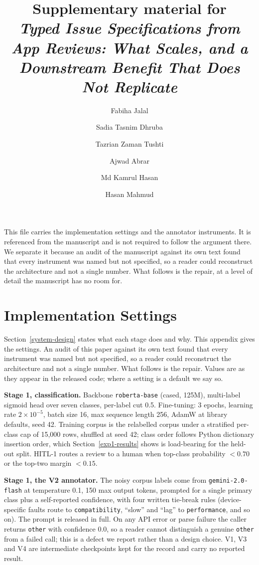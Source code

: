 \documentclass[11pt]{article}
\title{Supplementary material for\\
\emph{Typed Issue Specifications from App Reviews: What Scales, and a Downstream Benefit That
Does Not Replicate}}
\author{Fabiha Jalal \and Sadia Tasnim Dhruba \and Tazrian Zaman Tushti \and Ajwad Abrar \and
Md Kamrul Hasan \and Hasan Mahmud}
\date{}
\begin{document}
\maketitle

This file carries the implementation settings and the annotator instruments. It is referenced
from the manuscript and is not required to follow the argument there. We separate it because an
audit of the manuscript against its own text found that every instrument was named but not
specified, so a reader could reconstruct the architecture and not a single number. What follows
is the repair, at a level of detail the manuscript has no room for.

\section{Implementation Settings}\label{appendix:settings}

  Section~\ref{system-design} states what each stage does and why. This appendix gives the
  settings. An audit of this paper against its own text found that every instrument was named but
  not specified, so a reader could reconstruct the architecture and not a single number. What
  follows is the repair. Values are as they appear in the released code; where a setting is a
  default we say so.

  \textbf{Stage 1, classification.} Backbone \texttt{roberta-base} (cased, 125M), multi-label
  sigmoid head over seven classes, per-label cut 0.5. Fine-tuning: 3 epochs, learning rate
  $2\times10^{-5}$, batch size 16, max sequence length 256, AdamW at library defaults, seed 42.
  Training corpus is the relabelled corpus under a stratified per-class cap of 15{,}000 rows,
  shuffled at seed 42; class order follows Python dictionary insertion order, which
  Section~\ref{exp1-results} shows is load-bearing for the held-out split. HITL-1 routes a review
  to a human when top-class probability $< 0.70$ or the top-two margin $< 0.15$.

  \textbf{Stage 1, the V2 annotator.} The noisy corpus labels come from
  \texttt{gemini-2.0-flash} at temperature 0.1, 150 max output tokens, prompted for a single
  primary class plus a self-reported confidence, with four written tie-break rules (device-specific
  faults route to \texttt{compatibility}, ``slow'' and ``lag'' to \texttt{performance}, and so on).
  The prompt is released in full. On any API error or parse failure the caller returns
  \texttt{other} with confidence 0.0, so a reader cannot distinguish a genuine \texttt{other} from
  a failed call; this is a defect we report rather than a design choice. V1, V3 and V4 are
  intermediate checkpoints kept for the record and carry no reported result.
\end{document}
